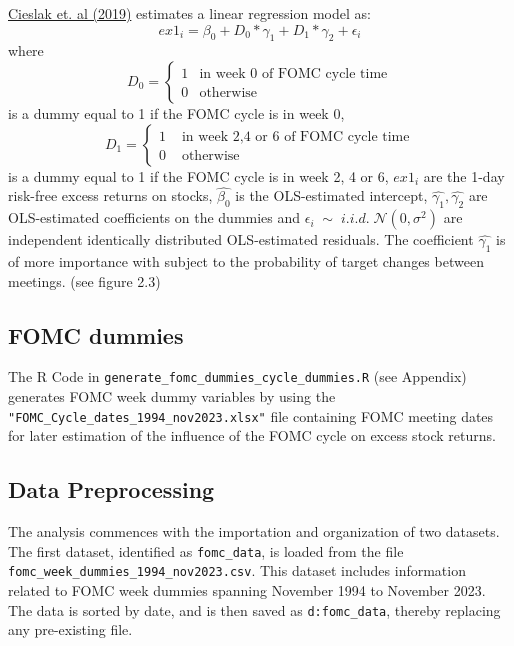 \hyperref[item:cieslak_stock_2019]{Cieslak et. al (2019)} estimates a linear regression model as:
\begin{equation}
	ex1_{i}=\beta_{0}+D_0*\gamma_{1}+D_1*\gamma_{2}+\epsilon_i
\end{equation}
where
\begin{equation}
    D_0=
    \begin{cases}
      1& \text{in week 0 of FOMC cycle time}\\
      0& \text{otherwise}
    \end{cases}
\end{equation}
is a dummy equal to 1 if the FOMC cycle is in week 0,
\begin{equation}
    D_1=
    \begin{cases}
      1 & \text{ in week 2,4 or 6 of FOMC cycle time} \\
      0 & \text{ otherwise}
    \end{cases}
\end{equation}
is a dummy equal to 1 if the FOMC cycle is in week 2,  4 or 6,
$ {ex1_{i}} $ are the 1-day risk-free excess returns on stocks,
$ { \hat{\beta_{0}} } $ is the OLS-estimated intercept,
$ { \hat{\gamma_{1}}, \hat{\gamma_{2}} } $  are OLS-estimated coefficients on the dummies and
$ { \epsilon_i \; \sim \; i.i.d.  \; \mathcal{N}\left(0, \sigma^2 \right) } $
are independent identically distributed OLS-estimated residuals. 
The coefficient $ {\hat{\gamma_{1}}} $ is of more importance with subject to the probability of target changes between meetings. (see figure 2.3)

\subsection{FOMC dummies}

The R Code in \texttt{generate\_fomc\_dummies\_cycle\_dummies.R} (see Appendix)
generates FOMC week dummy variables by using the \texttt{"FOMC\_Cycle\_dates\_1994\_nov2023.xlsx"} file containing FOMC meeting dates for later estimation of the influence of the FOMC cycle on excess stock returns.

\subsection{Data Preprocessing}

The analysis commences with the importation and organization of two datasets. 
The first dataset, identified as \texttt{fomc\_data}, is loaded from the file \\
\texttt{fomc\_week\_dummies\_1994\_nov2023.csv}. 
This dataset includes information related to FOMC week dummies spanning November 1994 to November 2023. The data is sorted by date, and is then saved as \texttt{d:fomc\_data}, thereby replacing any pre-existing file.

